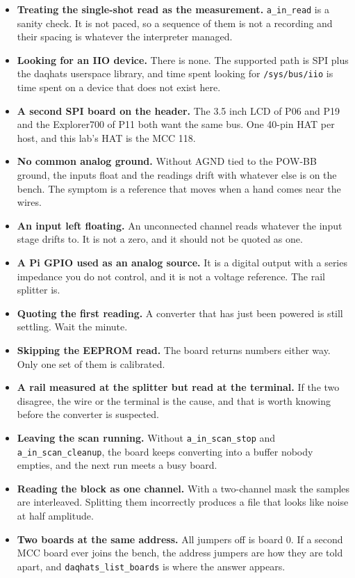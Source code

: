 \begin{itemize}
\item \textbf{Treating the single-shot read as the measurement.} \texttt{a\_in\_read} is a sanity check. It is not paced, so a sequence of them is not a recording and their spacing is whatever the interpreter managed.
\item \textbf{Looking for an IIO device.} There is none. The supported path is SPI plus the daqhats userspace library, and time spent looking for \texttt{/sys/bus/iio} is time spent on a device that does not exist here.
\item \textbf{A second SPI board on the header.} The 3.5 inch LCD of P06 and P19 and the Explorer700 of P11 both want the same bus. One 40-pin HAT per host, and this lab's HAT is the MCC 118.
\item \textbf{No common analog ground.} Without AGND tied to the POW-BB ground, the inputs float and the readings drift with whatever else is on the bench. The symptom is a reference that moves when a hand comes near the wires.
\item \textbf{An input left floating.} An unconnected channel reads whatever the input stage drifts to. It is not a zero, and it should not be quoted as one.
\item \textbf{A Pi GPIO used as an analog source.} It is a digital output with a series impedance you do not control, and it is not a voltage reference. The rail splitter is.
\item \textbf{Quoting the first reading.} A converter that has just been powered is still settling. Wait the minute.
\item \textbf{Skipping the EEPROM read.} The board returns numbers either way. Only one set of them is calibrated.
\item \textbf{A rail measured at the splitter but read at the terminal.} If the two disagree, the wire or the terminal is the cause, and that is worth knowing before the converter is suspected.
\item \textbf{Leaving the scan running.} Without \texttt{a\_in\_scan\_stop} and \texttt{a\_in\_scan\_cleanup}, the board keeps converting into a buffer nobody empties, and the next run meets a busy board.
\item \textbf{Reading the block as one channel.} With a two-channel mask the samples are interleaved. Splitting them incorrectly produces a file that looks like noise at half amplitude.
\item \textbf{Two boards at the same address.} All jumpers off is board 0. If a second MCC board ever joins the bench, the address jumpers are how they are told apart, and \texttt{daqhats\_list\_boards} is where the answer appears.

\end{itemize}
